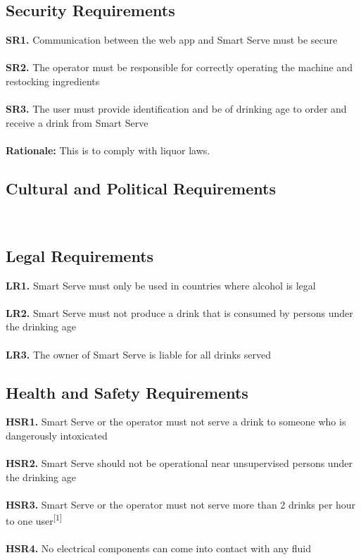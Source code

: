 \documentclass{article}
\begin{document}
\subsection{Security Requirements}
    \noindent\textbf{SR1.} Communication between the web app and Smart Serve must be secure \\\\
    \textbf{SR2.} The operator must be responsible for correctly operating the machine and restocking ingredients \\\\
    \textbf{SR3.} The user must provide identification and be of drinking age to order and receive a drink from Smart Serve \\\\
    \textbf{Rationale:} This is to comply with liquor laws.

\subsection{Cultural and Political Requirements}
     \\
\subsection{Legal Requirements}
    \noindent\textbf{LR1.} Smart Serve must only be used in countries where alcohol is legal \\\\
    \textbf{LR2.} Smart Serve must not produce a drink that is consumed by persons under the drinking age \\\\
    \textbf{LR3.} The owner of Smart Serve is liable for all drinks served \\

\subsection{Health and Safety Requirements}
    \noindent\textbf{HSR1.} Smart Serve or the operator must not serve a drink to someone who is dangerously intoxicated \\\\
    \textbf{HSR2.} Smart Serve should not be operational near unsupervised persons under the drinking age \\\\
    \textbf{HSR3.} Smart Serve or the operator must not serve more than 2 drinks per hour to one user\textsuperscript{[1]} \\\\
    \textbf{HSR4.} No electrical components can come into contact with any fluid \\
\end{document}
